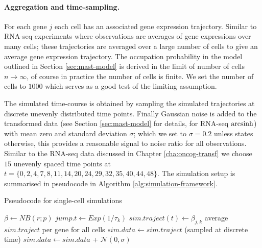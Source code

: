 \paragraph{Aggregation and time-sampling.}
\label{sec:aggr-time-sampl}
For each gene $j$ each cell has an associated gene expression trajectory. Similar to RNA-seq experiments where observations are averages of gene expressions over many cells; these trajectories are averaged over a large number of cells to give an average gene expression trajectory. The occupation probability in the model outlined in Section \ref{sec:mast-model} is derived in the limit of number of cells $n \rightarrow \infty$, of course in practice the number of cells is finite. We set the number of cells to $1000$ which serves as a good test of the limiting assumption.

The simulated time-course is obtained by sampling the simulated trajectories at discrete unevenly distributed time points. Finally Gaussian noise is added to the transformed data (see Section \ref{sec:mast-model} for details, for RNA-seq $\operatorname{arcsinh}$) with mean zero and standard deviation $\sigma$; which we set to $\sigma=0.2$ unless states otherwise, this provides a reasonable signal to noise ratio for all observations. Similar to the RNA-seq data discussed in Chapter \ref{cha:oncog-transf} we choose $15$ unevenly spaced  time points at $t=\lbrace 0,  2,  4,  7,  8, 11, 14, 20, 24, 29, 32, 35, 40, 44, 48\rbrace$. The simulation setup is summarised in pseudocode in Algorithm \ref{alg:simulation-framework}.


\begin{algorithm}
    \caption{Pseudocode for single-cell simulations}\label{alg:simulation-framework}
    \begin{algorithmic}[0]
        \State $\beta \gets   NB(r;p)$
        \State $jump.t \gets Exp(1/\tau_k)$
        \State $sim.traject(t) \gets \beta_{j,k}$
        \EndWhile
        \EndFor
        \EndFor
        \EndFor
        \State average $sim.traject$ per gene for all cells
        \State $sim.data \gets sim.traject$ (sampled at discrete time)
        \State $sim.data \gets sim.data$ + $\mathcal{N}(0, \sigma)$
        \EndProcedure
      \end{algorithmic}
\end{algorithm}

